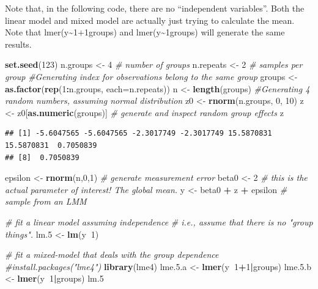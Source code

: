 \documentclass[]{book}
\newenvironment{Shaded}{\begin{snugshade}}{\end{snugshade}}
\newcommand{\KeywordTok}[1]{\textcolor[rgb]{0.13,0.29,0.53}{\textbf{#1}}}
\newcommand{\DataTypeTok}[1]{\textcolor[rgb]{0.13,0.29,0.53}{#1}}
\newcommand{\DecValTok}[1]{\textcolor[rgb]{0.00,0.00,0.81}{#1}}
\newcommand{\FloatTok}[1]{\textcolor[rgb]{0.00,0.00,0.81}{#1}}
\newcommand{\StringTok}[1]{\textcolor[rgb]{0.31,0.60,0.02}{#1}}
\newcommand{\CommentTok}[1]{\textcolor[rgb]{0.56,0.35,0.01}{\textit{#1}}}
\newcommand{\OperatorTok}[1]{\textcolor[rgb]{0.81,0.36,0.00}{\textbf{#1}}}
\newcommand{\NormalTok}[1]{#1}
\begin{document}
Note that, in the following code, there are no ``independent
variables''. Both the linear model and mixed model are actually just
trying to calculate the mean. Note that
lmer(y\textasciitilde{}1+1\textbar{}groups) and
lmer(y\textasciitilde{}1\textbar{}groups) will generate the same
results.

\begin{Shaded}
\begin{Highlighting}[]
\KeywordTok{set.seed}\NormalTok{(}\DecValTok{123}\NormalTok{)}
\NormalTok{n.groups <-}\StringTok{ }\DecValTok{4} \CommentTok{# number of groups}
\NormalTok{n.repeats <-}\StringTok{ }\DecValTok{2} \CommentTok{# samples per group}
\CommentTok{#Generating index for observations belong to the same group}
\NormalTok{groups <-}\StringTok{ }\KeywordTok{as.factor}\NormalTok{(}\KeywordTok{rep}\NormalTok{(}\DecValTok{1}\OperatorTok{:}\NormalTok{n.groups, }\DataTypeTok{each=}\NormalTok{n.repeats))}
\NormalTok{n <-}\StringTok{ }\KeywordTok{length}\NormalTok{(groups)}
\CommentTok{#Generating 4 random numbers, assuming normal distribution}
\NormalTok{z0 <-}\StringTok{ }\KeywordTok{rnorm}\NormalTok{(n.groups, }\DecValTok{0}\NormalTok{, }\DecValTok{10}\NormalTok{) }
\NormalTok{z <-}\StringTok{ }\NormalTok{z0[}\KeywordTok{as.numeric}\NormalTok{(groups)] }\CommentTok{# generate and inspect random group effects}
\NormalTok{z}
\end{Highlighting}
\end{Shaded}

\begin{verbatim}
## [1] -5.6047565 -5.6047565 -2.3017749 -2.3017749 15.5870831 15.5870831  0.7050839
## [8]  0.7050839
\end{verbatim}

\begin{Shaded}
\begin{Highlighting}[]
\NormalTok{epsilon <-}\StringTok{ }\KeywordTok{rnorm}\NormalTok{(n,}\DecValTok{0}\NormalTok{,}\DecValTok{1}\NormalTok{) }\CommentTok{# generate measurement error}
\NormalTok{beta0 <-}\StringTok{ }\DecValTok{2} \CommentTok{# this is the actual parameter of interest! The global mean.}
\NormalTok{y <-}\StringTok{ }\NormalTok{beta0 }\OperatorTok{+}\StringTok{ }\NormalTok{z }\OperatorTok{+}\StringTok{ }\NormalTok{epsilon }\CommentTok{# sample from an LMM}

\CommentTok{# fit a linear model assuming independence}
\CommentTok{# i.e., assume that there is no "group things".}
\NormalTok{lm.}\DecValTok{5}\NormalTok{ <-}\StringTok{ }\KeywordTok{lm}\NormalTok{(y}\OperatorTok{~}\DecValTok{1}\NormalTok{)}

\CommentTok{# fit a mixed-model that deals with the group dependence}
\CommentTok{#install.packages("lme4")}
\KeywordTok{library}\NormalTok{(lme4)}
\NormalTok{lme.}\FloatTok{5.}\NormalTok{a <-}\StringTok{ }\KeywordTok{lmer}\NormalTok{(y}\OperatorTok{~}\DecValTok{1}\OperatorTok{+}\DecValTok{1}\OperatorTok{|}\NormalTok{groups) }
\NormalTok{lme.}\FloatTok{5.}\NormalTok{b <-}\StringTok{ }\KeywordTok{lmer}\NormalTok{(y}\OperatorTok{~}\DecValTok{1}\OperatorTok{|}\NormalTok{groups) }
\NormalTok{lm.}\DecValTok{5}
\end{Highlighting}
\end{Shaded}
\end{document}
